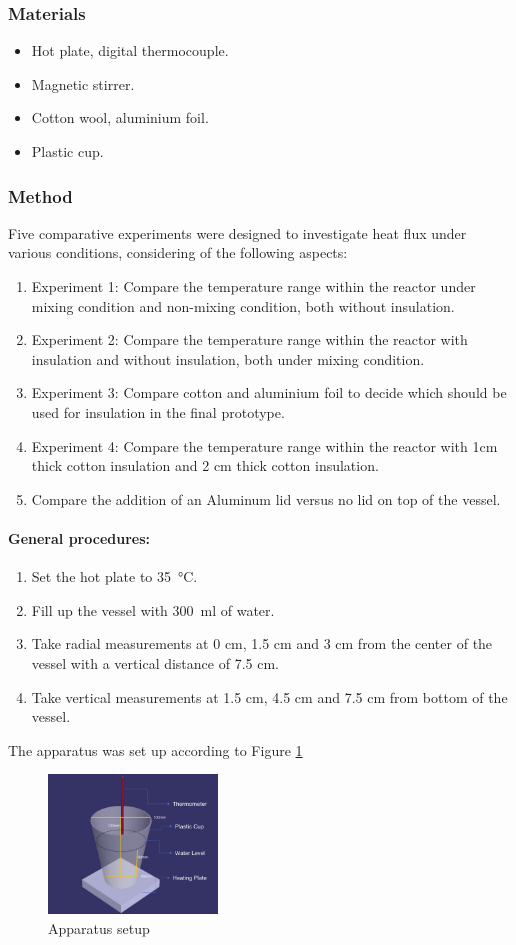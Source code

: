 \subsubsection{Materials}
\begin{itemize}
    \item Hot plate, digital thermocouple.
    \item Magnetic stirrer.
    \item Cotton wool, aluminium foil.
    \item Plastic cup.
\end{itemize}
\subsubsection{Method} \label{sec:Heating-method}
Five comparative experiments were designed to investigate heat flux under various conditions, considering of the following aspects:
\begin{enumerate}
    \item Experiment 1:  Compare the temperature range within the reactor under mixing condition and non-mixing condition, both without insulation. 
    \item Experiment 2: Compare the temperature range within the reactor with insulation and without insulation, both under mixing condition. 
    \item Experiment 3: Compare cotton and aluminium foil to decide which should be used for insulation in the final prototype. 
    \item Experiment 4: Compare the temperature range within the reactor with 1cm thick cotton insulation and 2 cm thick cotton insulation.
    \item Compare the addition of an Aluminum lid versus no lid on top of the vessel.
\end{enumerate}

\paragraph{General procedures:}
\begin{enumerate}
    \item Set the hot plate to \SI{35}{\celsius}.
    \item Fill up the vessel with \SI{300}{\milli\litre} of water.
    \item Take radial measurements at 0 cm, 1.5 cm and 3 cm from the center of the vessel with a vertical distance of 7.5 cm.
    \item Take vertical measurements at 1.5 cm, 4.5 cm and 7.5 cm from bottom of the vessel.
\end{enumerate}

The apparatus was set up according to Figure \ref{fig:Heating-setup}

\begin{figure}[h]
    \centering
    \includegraphics[width=0.40\textwidth]{Heating-cup.png}
    \caption{Apparatus setup}
    \label{fig:Heating-setup}
\end{figure}